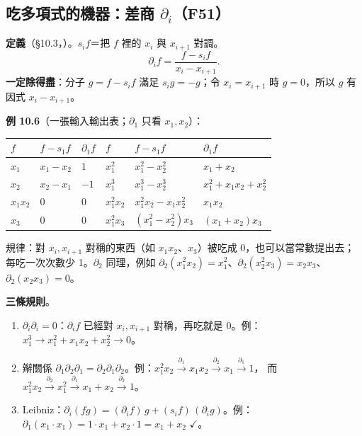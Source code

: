 \subsection{吃多項式的機器：差商 $\partial_i$（F51）}\label{sec:f-dd}

\textbf{定義}（\S10.3，）。$s_if$＝把 $f$ 裡的 $x_i$ 與 $x_{i+1}$ 對調。
\[
\partial_if=\frac{f-s_if}{x_i-x_{i+1}} .
\]
\textbf{一定除得盡}：分子 $g=f-s_if$ 滿足 $s_ig=-g$；令 $x_i=x_{i+1}$ 時 $g=0$，所以 $g$ 有因式 $x_i-x_{i+1}$。

\textbf{例 10.6}（一張輸入輸出表；$\partial_1$ 只看 $x_1,x_2$）：
\begin{center}
\begin{tabular}{@{}lll@{\qquad}lll@{}}
\toprule
$f$ & $f-s_1f$ & $\partial_1f$ & $f$ & $f-s_1f$ & $\partial_1f$\\
\midrule
$x_1$ & $x_1-x_2$ & $1$ & $x_1^2$ & $x_1^2-x_2^2$ & $x_1+x_2$\\
$x_2$ & $x_2-x_1$ & $-1$ & $x_1^3$ & $x_1^3-x_2^3$ & $x_1^2+x_1x_2+x_2^2$\\
$x_1x_2$ & $0$ & $0$ & $x_1^2x_2$ & $x_1^2x_2-x_1x_2^2$ & $x_1x_2$\\
$x_3$ & $0$ & $0$ & $x_1^2x_3$ & $(x_1^2-x_2^2)x_3$ & $(x_1+x_2)x_3$\\
\bottomrule
\end{tabular}
\end{center}
規律：對 $x_i,x_{i+1}$ 對稱的東西（如 $x_1x_2$、$x_3$）被吃成 0，也可以當常數提出去；每吃一次次數少 1。$\partial_2$ 同理，例如 $\partial_2(x_1^2x_2)=x_1^2$、$\partial_2(x_2^2x_3)=x_2x_3$、$\partial_2(x_2x_3)=0$。

\textbf{三條規則}。
\begin{enumerate}[nosep]
\item $\partial_i\partial_i=0$：$\partial_if$ 已經對 $x_i,x_{i+1}$ 對稱，再吃就是 0。例：$x_1^3\to x_1^2+x_1x_2+x_2^2\to0$。
\item 辮關係 $\partial_1\partial_2\partial_1=\partial_2\partial_1\partial_2$。例：$x_1^2x_2\xrightarrow{\partial_1}x_1x_2\xrightarrow{\partial_2}x_1\xrightarrow{\partial_1}1$，
      而 $x_1^2x_2\xrightarrow{\partial_2}x_1^2\xrightarrow{\partial_1}x_1+x_2\xrightarrow{\partial_2}1$。
\item Leibniz：$\partial_i(fg)=(\partial_if)\,g+(s_if)\,(\partial_ig)$。例：$\partial_1(x_1\cdot x_1)=1\cdot x_1+x_2\cdot1=x_1+x_2$ $\checkmark$。
\end{enumerate}

